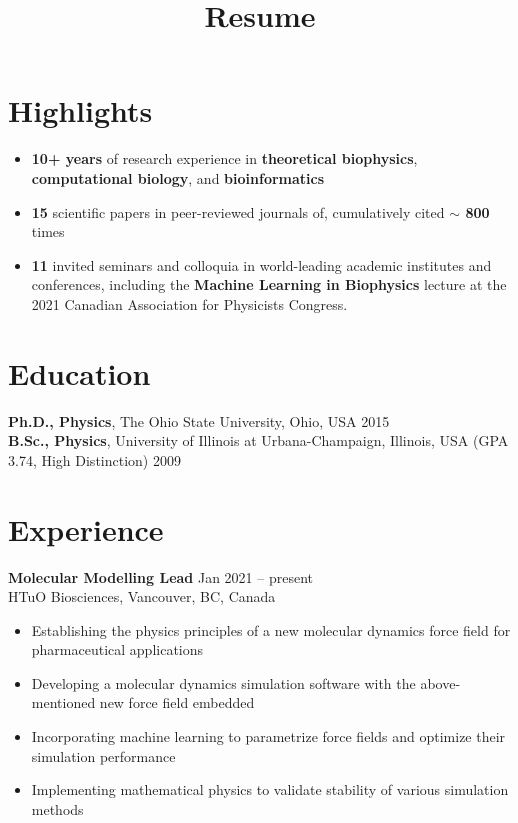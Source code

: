 \documentclass[11pt]{../yhlcv}
\begin{document}
\title{Resume}

\maketitle

\raggedright

\section*{Highlights}

\begin{itemize}[leftmargin=*]\itemsep-0.2em
\item {\bf 10+ years} of research experience in {\bf theoretical biophysics}, {\bf computational biology}, and {\bf bioinformatics}
\item {\bf 15} scientific papers in peer-reviewed journals of, cumulatively cited {\bf $\sim$ 800} times
\item {\bf 11} invited seminars and colloquia in world-leading academic institutes and conferences, including the {\bf Machine Learning in Biophysics} lecture at the 2021 Canadian Association for Physicists Congress.
\end{itemize}

\section*{Education}

{\bf Ph.D., Physics}, The Ohio State University, Ohio, USA \hfill 2015 \\
{\bf B.Sc., Physics}, University of Illinois at Urbana-Champaign, Illinois, USA (GPA 3.74, High Distinction) \hfill 2009

\section*{Experience}

{\bf Molecular Modelling Lead}  \hfill Jan 2021 -- present \vspace{0.25em} \\
HTuO Biosciences, Vancouver, BC, Canada 
\vspace{-0.7em} \\
\begin{itemize}[leftmargin=*]\itemsep-0.2em
\item Establishing the physics principles of a new molecular dynamics force field for pharmaceutical applications
\item Developing a molecular dynamics simulation software with the above-mentioned new force field embedded
\item Incorporating machine learning to parametrize force fields and optimize their simulation performance
\item Implementing mathematical physics to validate stability of various simulation methods
\end{itemize}
\end{document}
